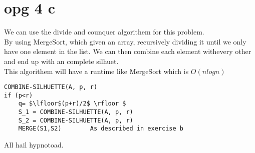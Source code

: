 \documentclass{article}
\begin{document}
\section*{opg 4 c}
We can use the divide and counquer algorithem for this problem.\\
By using MergeSort, which given an array, recursively dividing it until we only have one element in the list. We can then combine each element withevery other and end up with an complete silhuet.\\
This algorithem will have a runtime like MergeSort which is $O(n logn)$
\begin{lstlisting}[mathescape]
COMBINE-SILHUETTE(A, p, r)
if (p<r)
    q= $\lfloor$(p+r)/2$ \rfloor $
    S_1 = COMBINE-SILHUETTE(A, p, r)
    S_2 = COMBINE-SILHUETTE(A, p, r)
    MERGE(S1,S2)        As described in exercise b
\end{lstlisting}

All hail hypnotoad.
\end{document}
